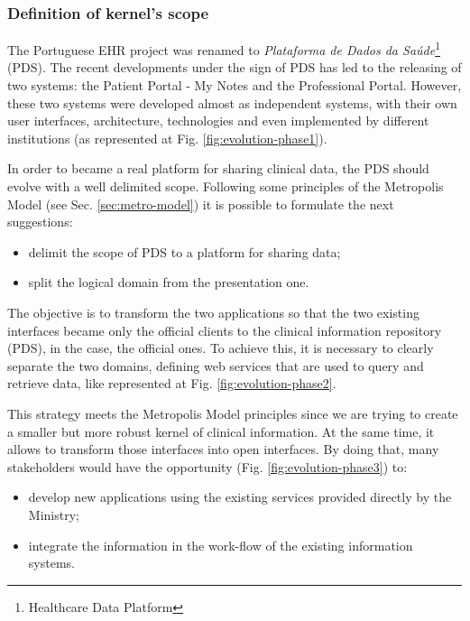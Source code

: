 \subsubsection{Definition of kernel's scope}

The Portuguese EHR project was renamed to \textit{Plataforma de Dados da Saúde}\footnote{Healthcare Data Platform} (PDS). The recent developments under the sign of PDS has led to the releasing of two systems: the Patient Portal - My Notes and the Professional Portal. However, these two systems were developed almost as independent systems, with their own user interfaces, architecture, technologies and even implemented by different institutions (as represented at Fig. \ref{fig:evolution-phase1}).


In order to became a real platform for sharing clinical data, the PDS should evolve with a well delimited scope. Following some principles of the Metropolis Model (see Sec. \ref{sec:metro-model}) it is possible to formulate the next suggestions:
\begin{itemize}
\item delimit the scope of PDS to a platform for sharing data;
\item split the logical domain from the presentation one.
\end{itemize}

The objective is to transform the two applications so that the two existing interfaces became only the official clients to the clinical information repository (PDS), in the case, the official ones. To achieve this, it is necessary to clearly separate the two domains, defining web services that are used to query and retrieve data, like represented at Fig. \ref{fig:evolution-phase2}.


This strategy meets the Metropolis Model principles since we are trying to create a smaller but more robust kernel of clinical information. At the same time, it allows to transform those interfaces into open interfaces. By doing that, many stakeholders would have the opportunity (Fig. \ref{fig:evolution-phase3}) to: 
\begin{itemize}
\item develop new applications using the existing services provided directly by the Ministry;
\item integrate the information in the work-flow of the existing information systems.
\end{itemize}

